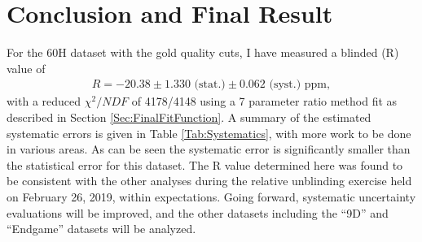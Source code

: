 
\chapter{Conclusion and Final Result}
\label{Ch:Conclusion}


For the 60H dataset with the gold quality cuts, I have measured a blinded \wa (R) value of
	\begin{gather}
		R = -20.38 \pm 1.330 \text{ (stat.)} \pm 0.062 \text{ (syst.) ppm},
	\end{gather}
with a reduced $\chi^{2}/NDF$ of 4178/4148 using a 7 parameter ratio method fit as described in Section \ref{Sec:FinalFitFunction}. A summary of the estimated systematic errors is given in Table \ref{Tab:Systematics}, with more work to be done in various areas. As can be seen the systematic error is significantly smaller than the statistical error for this dataset. The R value determined here was found to be consistent with the other analyses during the relative unblinding exercise held on February 26, 2019, within expectations. Going forward, systematic uncertainty evaluations will be improved, and the other datasets including the ``9D'' and ``Endgame'' datasets will be analyzed.


